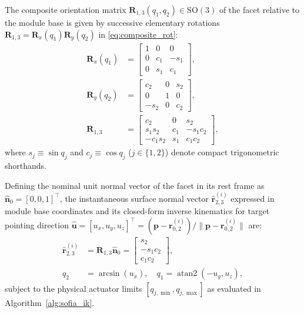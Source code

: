 \documentclass[lettersize,journal]{IEEEtran}
\begin{document}
	The composite orientation matrix $\mathbf{R}_{1,3}(q_1, q_2) \in \mathrm{SO}(3)$ of the facet relative to the module base is given by successive elementary rotations $\mathbf{R}_{1,3} = \mathbf{R}_x(q_1)\mathbf{R}_y(q_2)$ in \eqref{eq:composite_rot}:
	\begin{align}
		\mathbf{R}_x(q_1) &= \begin{bmatrix} 1 & 0 & 0 \\ 0 & c_1 & -s_1 \\ 0 & s_1 & c_1 \end{bmatrix}, \label{eq:elementary_rot_x} \\
		\mathbf{R}_y(q_2) &= \begin{bmatrix} c_2 & 0 & s_2 \\ 0 & 1 & 0 \\ -s_2 & 0 & c_2 \end{bmatrix}, \label{eq:elementary_rot_y} \\
		\mathbf{R}_{1,3} &= \begin{bmatrix}
			c_2 & 0 & s_2 \\
			s_1 s_2 & c_1 & -s_1 c_2 \\
			-c_1 s_2 & s_1 & c_1 c_2
		\end{bmatrix}, \label{eq:composite_rot}
	\end{align}
	where $s_j \equiv \sin q_j$ and $c_j \equiv \cos q_j$ ($j \in \{1, 2\}$) denote compact trigonometric shorthands.
	
	Defining the nominal unit normal vector of the facet in its rest frame as $\hat{\mathbf{n}}_0 = [0, 0, 1]^\top$, the instantaneous surface normal vector $\hat{\mathbf{r}}_{2,3}^{(i)}$ expressed in module base coordinates and its closed-form inverse kinematics for target pointing direction $\hat{\mathbf{u}} = [u_x, u_y, u_z]^\top = (\mathbf{p} - \mathbf{r}_{0,2}^{(i)}) / \lVert \mathbf{p} - \mathbf{r}_{0,2}^{(i)} \rVert$ are:
	\begin{align}
		\hat{\mathbf{r}}_{2,3}^{(i)} &= \mathbf{R}_{1,3} \hat{\mathbf{n}}_0 = \begin{bmatrix} s_2 \\ -s_1 c_2 \\ c_1 c_2 \end{bmatrix}, \label{eq:facet_normal} \\
		q_2 &= \arcsin(u_x), \quad q_1 = \operatorname{atan2}(-u_y, u_z), \label{eq:ik_closed_form}
	\end{align}
	subject to the physical actuator limits $[q_{j,\min}, q_{j,\max}]$ as evaluated in Algorithm~\ref{alg:sofia_ik}.
	
\end{document}
